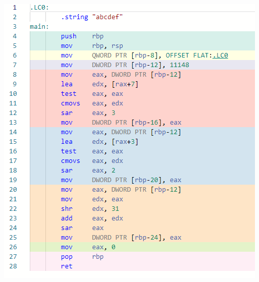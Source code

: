 \documentclass{article}
\begin{document}
\begin{enumerate}
\begin{center}
		    \includegraphics[width=.7\textwidth]{Imagenes/ejercicio 4.1.png}
		\end{center}\newpage
		

\end{enumerate}
\end{document}
